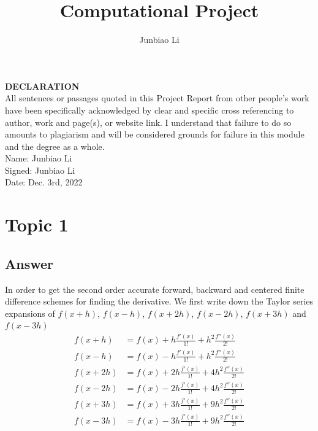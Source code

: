 \documentclass[
	12pt, %
]{fphw}
\title{Computational Project} %
\author{Junbiao Li} %
\institute{University of Leicester} %
\numberwithin{equation}{section}
\numberwithin{figure}{section}
\numberwithin{table}{section}
\begin{document}
\maketitle %

\begin{problem}
\textbf{DECLARATION} \\
All sentences or passages quoted in this Project Report from other people's work have been specifically acknowledged by clear and specific cross referencing to author, work and page(s), or website link. I understand that failure to do so amounts to plagiarism and will be considered grounds for failure in this module and the degree as a whole.\\
Name: Junbiao Li\\
Signed: Junbiao Li\\
Date: Dec. 3rd, 2022
\end{problem}

\section{Topic 1}



\subsection*{Answer}

In order to get the second order accurate forward, backward and centered finite difference
schemes for finding the derivative. We first write down the Taylor series expansions of $f(x+h)$, $f(x-h)$, $f(x+2h)$,  $f(x-2h)$, $f(x+3h)$ and $f(x-3h)$
\begin{equation} \label{eq1}
	\begin{aligned}
		f(x+h)  & =f(x)+h\frac{f'(x)}{1 !}+h^2 \frac{f''(x)}{2 !}   \\
		f(x-h)  & =f(x)-h\frac{f'(x)}{1 !}+h^2 \frac{f''(x)}{2 !}   \\
		f(x+2h) & =f(x)+2h\frac{f'(x)}{1 !}+4h^2 \frac{f''(x)}{2 !} \\
		f(x-2h) & =f(x)-2h\frac{f'(x)}{1 !}+4h^2 \frac{f''(x)}{2 !} \\
		f(x+3h) & =f(x)+3h\frac{f'(x)}{1 !}+9h^2 \frac{f''(x)}{2 !} \\
		f(x-3h) & =f(x)-3h\frac{f'(x)}{1 !}+9h^2 \frac{f''(x)}{2 !} \\
	\end{aligned}
\end{equation}
\end{document}
